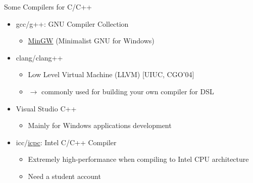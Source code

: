 \documentclass{../TexTemplate/myslide}
\begin{document}
\begin{frame}{Some Compilers for C/C++}
\begin{itemize}
\item gcc/g++: GNU Compiler Collection
\begin{itemize}
	\item \href{http://www.mingw.org/}{MinGW} (Minimalist GNU for Windows)
\end{itemize}
\item clang/clang++
\begin{itemize}
	\item Low Level Virtual Machine (LLVM) [UIUC, CGO'04]
	\item $\to$ commonly used for building your own compiler for DSL
\end{itemize}
\item Visual Studio C++
\begin{itemize}
	\item Mainly for Windows applications development
\end{itemize}
\item icc/\href{https://software.intel.com/en-us/c-compilers}{icpc}: Intel C/C++ Compiler
\begin{itemize}
	\item Extremely high-performance when compiling to Intel CPU architecture
	\item Need a student account
\end{itemize}
\end{itemize}
\end{frame}
\end{document}
